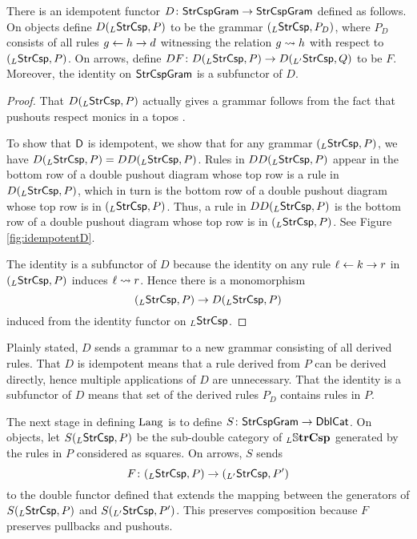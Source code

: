 \documentclass{amsart}
\begin{document}
\begin{lemma}
  There is an idempotent functor
  $ D \colon \mathsf{StrCspGram} \to \mathsf{StrCspGram} $ defined as
  follows. On objects define $ D ( _{L}\mathsf{StrCsp} , P ) $ to be
  the grammar $ ( _{L} \mathsf{StrCsp} , P_D) $, where $ P_D $
  consists of all rules $ g \leftarrow h \to d $ witnessing the
  relation $ g \rightsquigarrow h $ with respect to
  $ ( _{L}\mathsf{StrCsp} , P ) $. On arrows, define
  $ DF \colon D( _{L}\mathsf{StrCsp} , P ) \to D( _{L'}\mathsf{StrCsp} , Q )
  $ to be $ F $.  Moreover, the identity on $ \mathsf{StrCspGram} $
  is a subfunctor of $ D $.
\end{lemma}

\begin{proof}
  That $ D ( _{L}\mathsf{StrCsp} , P ) $ actually gives a grammar
  follows from the fact that pushouts respect monics in a
  topos \cite[Lem.~12]{LackSobo_Adhesive}.
  
  To show that $ \mathsf{D} $ is idempotent, we show that for any
  grammar $ ( _{L}\mathsf{StrCsp} , P ) $, we have
  $ D ( _{L}\mathsf{StrCsp} , P ) = DD ( _{L}\mathsf{StrCsp} , P ) $.  Rules
  in $ DD ( _{L}\mathsf{StrCsp} , P ) $ appear in the bottom row of a
  double pushout diagram whose top row is a rule in
  $ D ( _{L}\mathsf{StrCsp} , P ) $, which in turn is the bottom row
  of a double pushout diagram whose top row is in
  $ ( _{L}\mathsf{StrCsp} , P ) $. Thus, a rule in
  $ DD ( _{L}\mathsf{StrCsp} , P ) $ is the bottom row of a double
  pushout diagram whose top row is in
  $ ( _{L}\mathsf{StrCsp} , P ) $. See Figure \ref{fig:idempotentD}.

  

  The identity is a subfunctor of $ D $ because the identity
  on any rule $ \ell \leftarrow k \to r $ in
  $ ( _{L}\mathsf{StrCsp} , P ) $ induces $ \ell \rightsquigarrow r $.
  Hence there is a monomorphism
  \[
    ( _L \mathsf{StrCsp} , P ) \to
    D ( _L \mathsf{StrCsp} , P )
  \]
  induced from the identity functor on $ _L\mathsf{StrCsp} $.
\end{proof}

Plainly stated, $ D $ sends a grammar to a new grammar
consisting of all derived rules.  That $ D $ is idempotent
means that a rule derived from $ P $ can be derived
directly, hence multiple applications of $ D $ are
unnecessary.  That the identity is a subfunctor of $ D $
means that set of the derived rules $ P_D $ contains rules
in $ P $.

The next stage in defining $ \mathrm{Lang} $ is to define
$ S \colon \mathsf{StrCspGram} \to \mathsf{DblCat} $. On objects, let
$ S ( _L \mathsf{StrCsp} , P ) $ be the sub-double category of
$ _L \mathbb{S} \mathbf{trCsp} $ generated by the rules in $ P $ considered
as squares.  On arrows, $ S $ sends
\[
  F \colon ( _{L}\mathsf{StrCsp} , P ) \to ( _{L'} \mathsf{StrCsp} , P' )
\]
to the double functor defined that extends the mapping
between the generators of $ S ( _{L}\mathsf{StrCsp} , P ) $ and
$ S ( _{L'}\mathsf{StrCsp} , P' ) $.  This preserves composition because
$ F $ preserves pullbacks and pushouts. 
\end{document}
